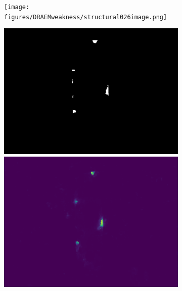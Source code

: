 \begin{figure}[H]
    \centering
    \begin{subfigure}[b]{0.48\textwidth}
        \centering
        \begin{minipage}{0.32\textwidth}
            \centering
            \texttt{[image: figures/DRAEMweakness/structural026image.png]}
        \end{minipage}
        \begin{minipage}{0.32\textwidth}
            \centering
            \includegraphics[width=\textwidth]{figures/DRAEMweakness/structural026mask.png}
        \end{minipage}
        \begin{minipage}{0.32\textwidth}
            \centering
            \includegraphics[width=\textwidth]{figures/DRAEMweakness/structural026segment.png}

\end{minipage}
\end{subfigure}
\end{figure}
